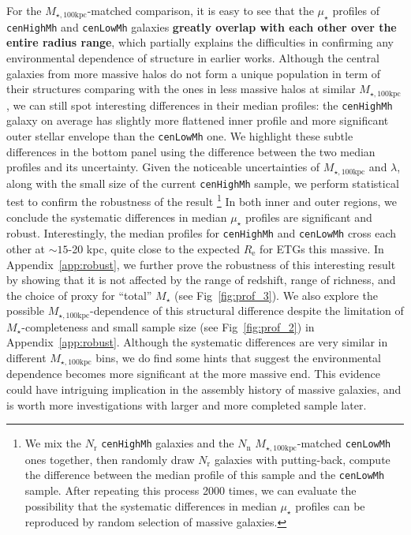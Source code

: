 \documentclass{emulateapj}
\def\rbcg{\texttt{cenHighMh}}
\def\nbcg{\texttt{cenLowMh}}
\def\mstar{{$M_{\star}$}}
\def\mtot{{$M_{\star,100\mathrm{kpc}}$}}
\def\mden{{$\mu_{\star}$}}
\begin{document}
\begin{CJK*}{UTF8}{gbsn}
    For the \mtot{}-matched comparison, it is easy to see that the \mden{}
    profiles of \rbcg{} and \nbcg{} galaxies \textbf{greatly overlap with each 
    other over the entire radius range}, which partially explains the difficulties in 
    confirming any environmental dependence of structure in earlier works.
    Although the central galaxies from more massive halos do not form a unique 
    population in term of their structures comparing with the ones in less massive
    halos at similar \mtot{}, we can still spot interesting differences in their 
    median profiles: the \rbcg{} galaxy on average has slightly more flattened inner 
    profile and more significant outer stellar envelope than the \nbcg{} one.
    We highlight these subtle differences in the bottom panel using the difference 
    between the two median profiles and its uncertainty. 
    Given the noticeable uncertainties of \mtot{} and $\lambda$, along with the 
    small size of the current \rbcg{} sample, we perform statistical test to confirm 
    the robustness of the result \footnote{We mix the $N_{\mathrm{r}}$ \rbcg{} 
    galaxies and the $N_{\mathrm{n}}$ \mtot{}-matched \nbcg{} ones together, then 
    randomly draw $N_{\mathrm{r}}$ galaxies with putting-back, compute the difference 
    between the median profile of this sample and the \nbcg{} sample. 
    After repeating this process 2000 times, we can evaluate the possibility that 
    the systematic differences in median \mden{} profiles can be reproduced by random 
    selection of massive galaxies.}
    In both inner and outer regions, we conclude the systematic differences in 
    median \mden{} profiles are significant and robust.
    Interestingly, the median profiles for \rbcg{} and \nbcg{} cross each other 
    at $\sim 15$-20 kpc, quite close to the expected $R_{\mathrm{e}}$ for ETGs 
    this massive. 
    In Appendix~\ref{app:robust}, we further prove the robustness of this 
    interesting result by showing that it is not affected by the range of redshift,
    range of richness, and the choice of proxy for ``total'' \mstar{} 
    (see Fig~\ref{fig:prof_3}). 
    We also explore the possible \mtot{}-dependence of this structural difference 
    despite the limitation of \mstar{}-completeness and small sample size
    (see Fig~\ref{fig:prof_2}) in Appendix~\ref{app:robust}.
    Although the systematic differences are very similar in different \mtot{} bins, 
    we do find some hints that suggest the environmental dependence becomes more 
    significant at the more massive end.  
    This evidence could have intriguing implication in the assembly history of 
    massive galaxies, and is worth more investigations with larger and more completed 
    sample later.  


\end{CJK*}
\end{document}
